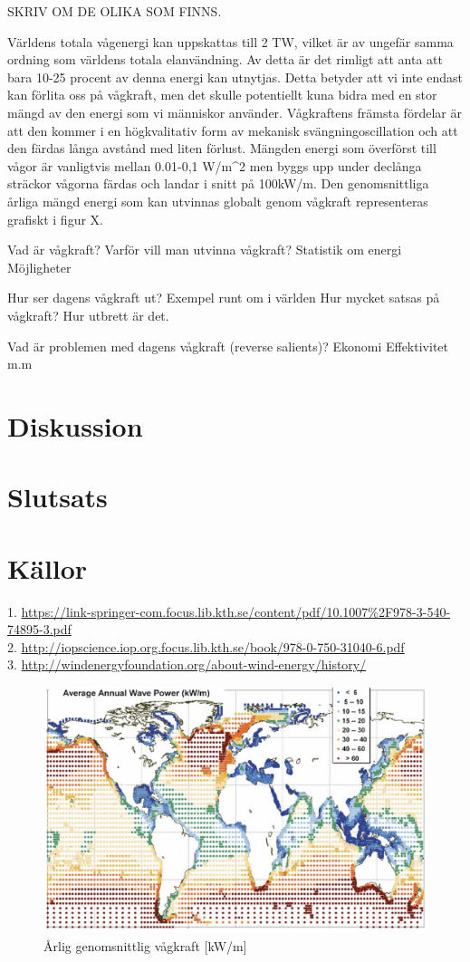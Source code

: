 \documentclass[10pt,a4paper,oneside]{article}
\begin{document}
SKRIV OM DE OLIKA SOM FINNS. 

Världens totala vågenergi kan uppskattas till 2 TW, vilket är av ungefär samma ordning som världens totala elanvändning. Av detta är det rimligt att anta att bara 10-25 procent av denna energi kan utnytjas. Detta betyder att vi inte endast kan förlita oss på vågkraft, men det skulle potentiellt kuna bidra med en stor mängd av den energi som vi människor använder. Vågkraftens främsta fördelar är att den kommer i en högkvalitativ form av mekanisk svängningoscillation och att den färdas långa avstånd med liten förlust. Mängden energi som överförst till vågor är vanligtvis mellan 0.01-0,1 W/m^2 men byggs upp under declånga sträckor vågorna färdas och landar i snitt på 100kW/m. Den genomsnittliga årliga mängd energi som kan utvinnas globalt genom vågkraft representeras grafiskt i figur X. 
 

Vad är vågkraft? 
Varför vill man utvinna vågkraft?
Statistik om energi 
Möjligheter 

Hur ser dagens vågkraft ut?
Exempel runt om i världen
Hur mycket satsas på vågkraft?
Hur utbrett är det.

Vad är problemen med dagens vågkraft (reverse salients)?
Ekonomi
Effektivitet 
m.m 

\section{Diskussion}

\section{Slutsats}

\section{Källor}
1. \url{https://link-springer-com.focus.lib.kth.se/content/pdf/10.1007%2F978-3-540-74895-3.pdf} \\
2. \url{http://iopscience.iop.org.focus.lib.kth.se/book/978-0-750-31040-6.pdf} \\
3. \url{http://windenergyfoundation.org/about-wind-energy/history/} \\




\begin{figure}
	\includegraphics[scale=0.6]{globalmean.png}
	\caption{Årlig genomsnittlig vågkraft [kW/m]}
\end{figure}
\end{document}
